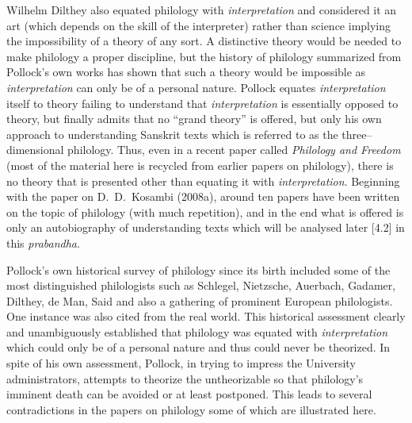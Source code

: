 Wilhelm Dilthey also equated philology with \textit{interpretation} and considered it an art (which depends on the skill of the interpreter) rather than science implying the impossibility of a theory of any sort. A distinctive theory would be needed to make philology a proper discipline, but the history of philology summarized from Pollock’s own works has shown that such a theory would be impossible as \textit{interpretation} can only be of a personal nature. Pollock equates \textit{interpretation} itself to theory failing to understand that\textit{ interpretation} is essentially opposed to theory, but finally admits that no “grand theory” is offered, but only his own approach to understanding Sanskrit texts which is referred to as the three–dimensional philology. Thus, even in a recent paper called \textit{Philology and Freedom} (most of the material here is recycled from earlier papers on philology), there is no theory that is presented other than equating it with \textit{interpretation}. Beginning with the paper on D.~D.~Kosambi (2008a), around ten papers have been written on the topic of philology (with much repetition), and in the end what is offered is only an autobiography of understanding texts which will be analysed later [4.2] in this \textit{prabandha}.

Pollock’s own historical survey of philology since its birth included some of the most distinguished philologists such as Schlegel, Nietzsche, Auerbach, Gadamer, Dilthey, de Man, Said and also a gathering of prominent European philologists. One instance was also cited from the real world. This historical assessment clearly and unambiguously established that philology was equated with \textit{interpretation} which could only be of a personal nature and thus could never be theorized. In spite of his own assessment, Pollock, in trying to impress the University administrators, attempts to theorize the untheorizable so that philology’s imminent death can be avoided or at least postponed. This leads to several contradictions in the papers on philology some of which are illustrated here.

